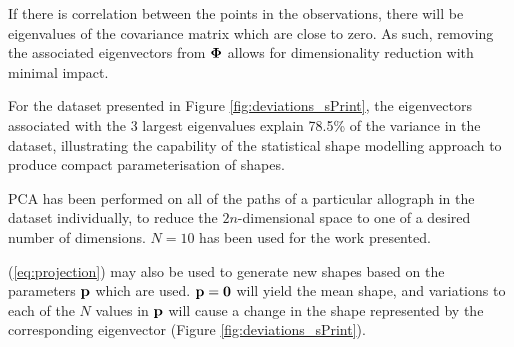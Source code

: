 \documentclass{sig-alternate}
\begin{document}
If there is correlation between the points in the observations, there will be
eigenvalues of the covariance matrix which are close to zero. As such, removing
the associated eigenvectors from ${\bf \Phi}$ allows for dimensionality
reduction with minimal impact. 
%

For the dataset presented in Figure \ref{fig:deviations_sPrint}, the
eigenvectors associated with the 3 largest eigenvalues explain 78.5\% of the
variance in the dataset, illustrating the capability of the statistical shape
modelling approach to produce compact parameterisation of shapes. 

%
%
PCA has been performed on all of the paths of a particular allograph in the
dataset individually, to reduce the $2n$-dimensional space to one of a desired
number of dimensions. $N=10$ has been used for the work presented.

(\ref{eq:projection}) may also be used
to generate new shapes based on the parameters ${\bf p}$ which are used. ${\bf
p}={\bf 0}$ will yield the mean shape, and variations to each of the $N$ values
in ${\bf p}$ will cause a change in the shape represented by the corresponding
eigenvector (Figure \ref{fig:deviations_sPrint}). 
\end{document}
